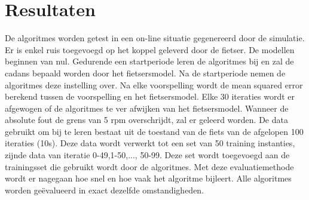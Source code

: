\chapter{Resultaten}
De algoritmes worden getest in een on-line situatie gegenereerd door de simulatie. Er is enkel ruis toegevoegd op het koppel geleverd door de fietser. De modellen beginnen van nul. Gedurende een startperiode leren de algoritmes bij en zal de cadans bepaald worden door het fietsersmodel. Na de startperiode nemen de algoritmes deze instelling over. Na elke voorspelling wordt de mean squared error berekend tussen de voorspelling en het fietsersmodel. Elke 30 iteraties wordt er afgewogen of de algoritmes te ver afwijken van het fietsersmodel. Wanneer de absolute fout de grens van 5 rpm overschrijdt, zal er geleerd worden. De data gebruikt om bij te leren bestaat uit de toestand van de fiets van de afgelopen 100 iteraties (10s). Deze data wordt verwerkt tot een set van 50 training instanties, zijnde data van iteratie 0-49,1-50,..., 50-99. Deze set wordt toegevoegd aan de trainingsset die gebruikt wordt door de algoritmes. Met deze evaluatiemethode wordt er nagegaan hoe snel en hoe vaak het algoritme bijleert. Alle algoritmes worden geëvalueerd in exact dezelfde omstandigheden.
